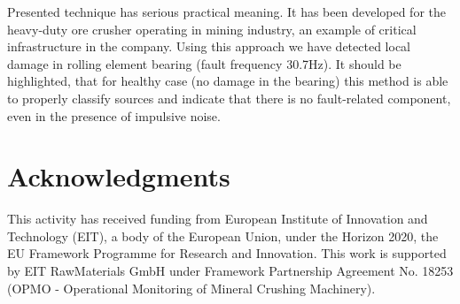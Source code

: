 \documentclass[3p,times]{elsarticle}
\begin{document}
Presented technique has serious practical meaning. It has been developed for the heavy-duty ore crusher operating in mining industry, an example of critical infrastructure in the company. Using this approach we have detected local damage in rolling element bearing (fault frequency 30.7Hz). It should be highlighted, that for healthy case (no damage in the bearing) this method is able to properly classify sources and indicate that there is no fault-related component, even in the presence of impulsive noise.


\section*{Acknowledgments}
This activity has received funding from European Institute of Innovation and Technology (EIT), a body of the European Union, under the Horizon 2020, the EU Framework Programme for Research and Innovation. This work is supported by EIT RawMaterials GmbH under Framework Partnership Agreement No. 18253 (OPMO - Operational Monitoring of Mineral Crushing Machinery).


\end{document}

